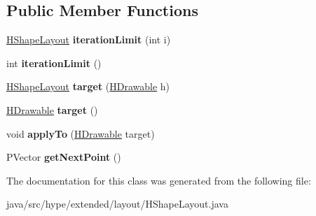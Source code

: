 \subsection*{Public Member Functions}
\begin{DoxyCompactItemize}
\item 
\hypertarget{classhype_1_1extended_1_1layout_1_1_h_shape_layout_acb7f96a78a56d6c50c20d73adec75d07}{\hyperlink{classhype_1_1extended_1_1layout_1_1_h_shape_layout}{H\-Shape\-Layout} {\bfseries iteration\-Limit} (int i)}\label{classhype_1_1extended_1_1layout_1_1_h_shape_layout_acb7f96a78a56d6c50c20d73adec75d07}

\item 
\hypertarget{classhype_1_1extended_1_1layout_1_1_h_shape_layout_a23916c0a0da5689c64a38494c1c1013d}{int {\bfseries iteration\-Limit} ()}\label{classhype_1_1extended_1_1layout_1_1_h_shape_layout_a23916c0a0da5689c64a38494c1c1013d}

\item 
\hypertarget{classhype_1_1extended_1_1layout_1_1_h_shape_layout_a1033e1214e5f14a2820a0d300c3fe3ea}{\hyperlink{classhype_1_1extended_1_1layout_1_1_h_shape_layout}{H\-Shape\-Layout} {\bfseries target} (\hyperlink{classhype_1_1core_1_1drawable_1_1_h_drawable}{H\-Drawable} h)}\label{classhype_1_1extended_1_1layout_1_1_h_shape_layout_a1033e1214e5f14a2820a0d300c3fe3ea}

\item 
\hypertarget{classhype_1_1extended_1_1layout_1_1_h_shape_layout_acb118667304ac3357a3e1452790a211c}{\hyperlink{classhype_1_1core_1_1drawable_1_1_h_drawable}{H\-Drawable} {\bfseries target} ()}\label{classhype_1_1extended_1_1layout_1_1_h_shape_layout_acb118667304ac3357a3e1452790a211c}

\item 
\hypertarget{classhype_1_1extended_1_1layout_1_1_h_shape_layout_a2f5964f6cf080bf01e6f59dff8134289}{void {\bfseries apply\-To} (\hyperlink{classhype_1_1core_1_1drawable_1_1_h_drawable}{H\-Drawable} target)}\label{classhype_1_1extended_1_1layout_1_1_h_shape_layout_a2f5964f6cf080bf01e6f59dff8134289}

\item 
\hypertarget{classhype_1_1extended_1_1layout_1_1_h_shape_layout_a4c3d491fa6833ff18989c1d1526b756c}{P\-Vector {\bfseries get\-Next\-Point} ()}\label{classhype_1_1extended_1_1layout_1_1_h_shape_layout_a4c3d491fa6833ff18989c1d1526b756c}

\end{DoxyCompactItemize}


The documentation for this class was generated from the following file\-:\begin{DoxyCompactItemize}
\item 
java/src/hype/extended/layout/H\-Shape\-Layout.\-java\end{DoxyCompactItemize}
